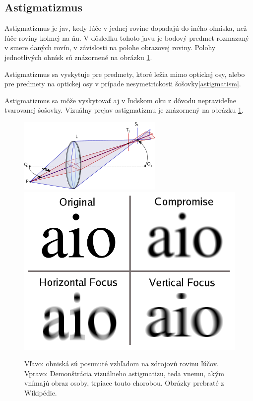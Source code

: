\subsection{Astigmatizmus}
Astigmatizmus je jav, kedy lúče v jednej rovine dopadajú do iného ohniska, než ľúče roviny kolmej na
ňu. V dôsledku tohoto javu je bodový predmet rozmazaný v smere daných rovín, v závislosti na polohe
obrazovej roviny. Polohy jednotlivých ohnísk sú znázornené na obrázku \ref{comaDescribe}.

Astigmatizmus sa vyskytuje pre predmety, ktoré ležia mimo optickej osy, alebo pre predmety na
optickej osy v prípade nesymetrickosti šošovky\ref{astigmatism}.

Astigmatizmus sa môže vyskytovať aj v ľudskom oku z dôvodu nepravideľne tvarovanej šošovky. 
Vizuálny prejav astigmatizmu je znázornený na obrázku \ref{comaDescribe}.

\begin{figure}[h]
    \label{comaDescribe}
\includegraphics[scale=0.60]{obrazky-figures/astigmatismRays.png}
\includegraphics[scale=0.18]{obrazky-figures/astigmatism.png}
    \centering \caption{Vľavo: ohniská sú posunuté vzhľadom na zdrojovú rovinu ľúčov.
     Vpravo: Demonštrácia vizuálneho astigmatizu, teda vnemu, akým vnímajú obraz osoby,
    trpiace touto chorobou. Obrázky prebraté z Wikipédie\cite{astigmatism}.}
\end{figure}



